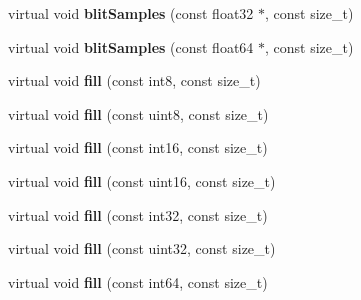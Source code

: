 \begin{DoxyCompactItemize}
\item 
\hypertarget{classgdf_1_1_channel_data_base_a4a8ae538a6e045dbd94a8a1487360a1f}{
virtual void {\bfseries blitSamples} (const float32 $\ast$, const size\_\-t)}
\label{classgdf_1_1_channel_data_base_a4a8ae538a6e045dbd94a8a1487360a1f}

\item 
\hypertarget{classgdf_1_1_channel_data_base_aa83b8a40a8e1055cda47fef0a55156b7}{
virtual void {\bfseries blitSamples} (const float64 $\ast$, const size\_\-t)}
\label{classgdf_1_1_channel_data_base_aa83b8a40a8e1055cda47fef0a55156b7}

\item 
\hypertarget{classgdf_1_1_channel_data_base_aad66caf102091d0b203f6245c39b960c}{
virtual void {\bfseries fill} (const int8, const size\_\-t)}
\label{classgdf_1_1_channel_data_base_aad66caf102091d0b203f6245c39b960c}

\item 
\hypertarget{classgdf_1_1_channel_data_base_aced7b48ea4079c8e9d50161e99114a46}{
virtual void {\bfseries fill} (const uint8, const size\_\-t)}
\label{classgdf_1_1_channel_data_base_aced7b48ea4079c8e9d50161e99114a46}

\item 
\hypertarget{classgdf_1_1_channel_data_base_af53bdd2dafcdc13d5394f7861dc77181}{
virtual void {\bfseries fill} (const int16, const size\_\-t)}
\label{classgdf_1_1_channel_data_base_af53bdd2dafcdc13d5394f7861dc77181}

\item 
\hypertarget{classgdf_1_1_channel_data_base_aaa262c6fdb92f5beb3804031f6f25b7f}{
virtual void {\bfseries fill} (const uint16, const size\_\-t)}
\label{classgdf_1_1_channel_data_base_aaa262c6fdb92f5beb3804031f6f25b7f}

\item 
\hypertarget{classgdf_1_1_channel_data_base_a121ce49a2f1e1e64bcd3b41869fb5fa3}{
virtual void {\bfseries fill} (const int32, const size\_\-t)}
\label{classgdf_1_1_channel_data_base_a121ce49a2f1e1e64bcd3b41869fb5fa3}

\item 
\hypertarget{classgdf_1_1_channel_data_base_ac7b5abe94d7d068eeb96cad924335889}{
virtual void {\bfseries fill} (const uint32, const size\_\-t)}
\label{classgdf_1_1_channel_data_base_ac7b5abe94d7d068eeb96cad924335889}

\item 
\hypertarget{classgdf_1_1_channel_data_base_a3a67a754117caa411204cbe821e74284}{
virtual void {\bfseries fill} (const int64, const size\_\-t)}
\label{classgdf_1_1_channel_data_base_a3a67a754117caa411204cbe821e74284}


\end{DoxyCompactItemize}
